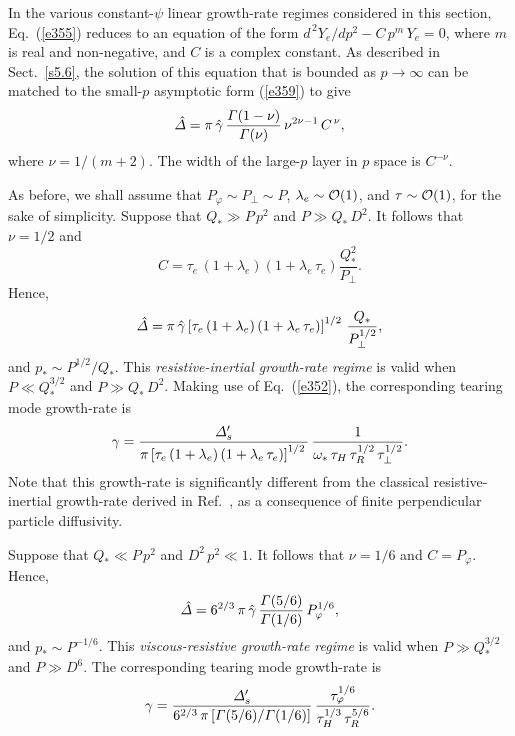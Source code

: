 \documentclass[12pt,prb,aps]{revtex4-1}
\begin{document}
In the various constant-$\psi$ linear growth-rate regimes considered in this section, Eq.~(\ref{e355}) reduces to an equation of the form
$d^{\,2} Y_e/dp^2 - C\,p^m\,Y_e = 0$,
where $m$ is real and non-negative, and $C$ is a complex constant. As described in Sect.~\ref{s5.6}, the solution of this
equation that is bounded as $p\rightarrow \infty$ can be matched to the small-$p$ asymptotic form (\ref{e359}) to give 
\begin{equation}
\hat{\mit\Delta} = \pi\,\hat{\gamma}\,\frac{{\mit\Gamma}(1-\nu)}{{\mit\Gamma}(\nu)}\,\nu^{2\nu-1}\,C^{\,\nu},
\end{equation}
where $\nu=1/(m+2)$. The width of the large-$p$ layer in $p$ space is $C^{-\nu}$. 

As before, we shall assume that $P_\varphi\sim P_\perp \sim P$, $\lambda_e\sim{\cal O}(1)$, and $\tau\sim {\cal O}(1)$, for
the sake of simplicity. 
Suppose that $Q_\ast\gg P\,p^2$ and $P\gg Q_\ast\,D^2$. It follows that $\nu=1/2$ and
\begin{equation}
C =\tau_e\, (1+\lambda_e)\left(1+\lambda_e\,\tau_e\right)\frac{Q_\ast^{2}}{P_\perp}.
\end{equation}
Hence, 
\begin{equation}
\hat{\mit\Delta} = \pi\,\hat{\gamma}\left[ \tau_e\,(1+\lambda_e)\left(1+\lambda_e\,\tau_e\right)\right]^{1/2}\,\frac{Q_\ast}{P_\perp^{1/2}},
\end{equation}
and $p_\ast\sim P^{1/2}/Q_\ast$. This {\em resistive-inertial  growth-rate regime}\/ is valid when $P\ll Q_\ast^{3/2}$ and
$P\gg Q_\ast\,D^2$. 
Making use of Eq.~(\ref{e352}), the corresponding tearing mode growth-rate is
\begin{equation}\label{e363}
\gamma = \frac{{\mit\Delta}_s'}{\pi\left[ \tau_e\,(1+\lambda_e)\left(1+\lambda_e\,\tau_e\right)\right]^{1/2}\,}\,\frac{1}{\omega_\ast\,\tau_H\,\tau_R^{1/2}\,\tau_\perp^{1/2}}.
\end{equation}
Note that this growth-rate is significantly different from 
the classical resistive-inertial growth-rate derived in Ref.~,  as a consequence of finite perpendicular particle diffusivity. 

Suppose that $Q_\ast \ll P\,p^2$ and $D^2\,p^2\ll 1$. 
It follows that $\nu=1/6$ and
$C = P_\varphi$. 
Hence, 
\begin{equation}
\hat{\mit\Delta} = 6^{2/3}\,\pi\,\hat{\gamma}\, \frac{{\mit\Gamma}(5/6)}{{\mit\Gamma}(1/6)}\,P_\varphi^{1/6}, 
\end{equation}
and $p_\ast\sim P^{-1/6}$. This  {\em viscous-resistive growth-rate regime}\/ is valid when $P\gg Q_\ast^{3/2}$ and
$P\gg D^6$. 
The corresponding tearing mode growth-rate is
\begin{equation}\label{e365}
\gamma = \frac{{\mit\Delta}_s'}{6^{2/3}\,\pi\,[{\mit\Gamma}(5/6)/{\mit\Gamma}(1/6)]}\,\frac{\tau_\varphi^{1/6}}{\tau_H^{1/3}\,\tau_R^{5/6}}.
\end{equation}
\end{document}
